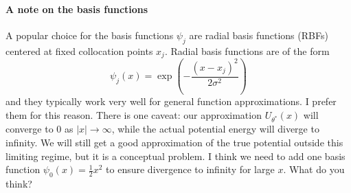 \documentclass{article}
\begin{document}
\paragraph{A note on the basis functions} A popular choice for the basis functions $\psi_j$ are radial basis functions (RBFs) centered at fixed collocation points $x_j$. Radial basis functions are of the form
\begin{equation}
    \psi_j(x) = \exp\left(-\frac{(x - x_j)^2}{2 \sigma^2}\right)
\end{equation}
and they typically work very well for general function approximations. I prefer them for this reason. There is one caveat: our approximation $U_{\theta^*}(x)$ will converge to $0$ as $|x| \to \infty$, while the actual potential energy will diverge to infinity. We will still get a good approximation of the true potential outside this limiting regime, but it is a conceptual problem. I think we need to add one basis function $\psi_0(x) = \frac{1}{2} x^2$ to ensure divergence to infinity for large $x$. What do you think?




\end{document}
